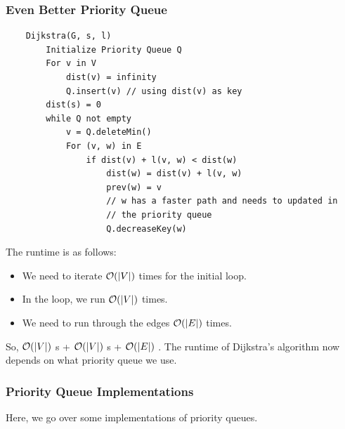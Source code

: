 \documentclass[letterpaper]{article}
\begin{document}
\subsubsection{Even Better Priority Queue}
\begin{verbatim}
    Dijkstra(G, s, l)
        Initialize Priority Queue Q 
        For v in V
            dist(v) = infinity
            Q.insert(v) // using dist(v) as key
        dist(s) = 0
        while Q not empty
            v = Q.deleteMin()
            For (v, w) in E
                if dist(v) + l(v, w) < dist(w)
                    dist(w) = dist(v) + l(v, w)
                    prev(w) = v
                    // w has a faster path and needs to updated in
                    // the priority queue 
                    Q.decreaseKey(w)
\end{verbatim}
The runtime is as follows: 
\begin{itemize}
    \item We need to iterate $\mathcal{O}(|V|)$ times for the initial loop. 
    \item In the  loop, we run $\mathcal{O}(|V|)$ times. 
    \item We need to run through the edges $\mathcal{O}(|E|)$ times. 
\end{itemize}
So, $\mathcal{O}(|V|)$ s + $\mathcal{O}(|V|)$ s + $\mathcal{O}(|E|)$ . The runtime of Dijkstra's algorithm now depends on what priority queue we use. 

\subsubsection{Priority Queue Implementations}
Here, we go over some implementations of priority queues. 
\end{document}
